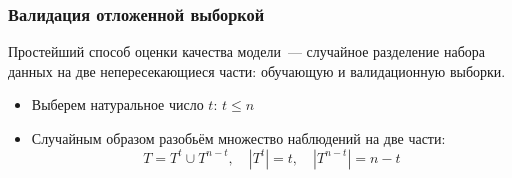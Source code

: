 \documentclass{beamer}
\begin{document}
\begin{frame}
  \frametitle{Валидация отложенной выборкой}

  Простейший способ оценки качества модели~--- случайное разделение набора данных на две непересекающиеся части: обучающую и валидационную выборки.

  \begin{itemize}
    \item Выберем натуральное число $t$: $t \leq n$
    \item Случайным образом разобьём множество наблюдений на две части:
    $$T = T^{t} \cup T^{n-t}, \quad |T^{t}| = t, \quad |T^{n-t}| = n - t$$
  \end{itemize}

\end{frame}

\end{document}
